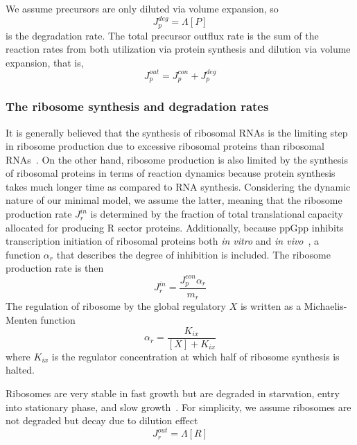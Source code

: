 \documentclass[11pt]{article}
\begin{document}
{We assume precursors {\color{black}are only diluted via volume expansion,} so
\begin{equation}
J_p^{deg}  = \Lambda[P]
\end{equation}
{\color{black}is the degradation rate.}
The total precursor outflux rate is {\color{black}the} sum of {\color{black}the} reaction rates from both {\color{black}utilization via} protein synthesis and dilution {\color{black}via volume expansion}, that is,
\begin{equation}\label{eq:aminoacid_outflux}
J_p^{out} = J_p^{con} + J_p^{deg} 
\end{equation}

\subsubsection{The ribosome synthesis and degradation rates}

It is generally believed that the synthesis of ribosomal RNAs is the limiting step in ribosome production due to excessive ribosomal proteins than ribosomal RNAs~\cite{gourse1996rrna}. On the other hand, ribosome production is also limited by the synthesis of ribosomal proteins in terms of reaction dynamics because protein synthesis takes much longer time as compared to RNA synthesis. Considering the dynamic nature of our minimal model, we assume the latter, meaning that the ribosome production rate $J_r^{in}$ is determined by the fraction of total translational capacity allocated for producing R sector proteins. {\color{black} Additionally, because ppGpp inhibits transcription initiation of ribosomal proteins both \textit{in vitro} and \textit{in vivo}~\cite{lemke2011direct}, a function $\alpha_r$ that describes the degree of inhibition is included. The ribosome production rate is then}
\begin{equation}\label{eq:ribosome_synthesis_rate}
J_r^{in} = \dfrac{J_p^{con}\alpha_r}{m_r}
\end{equation}
The regulation of ribosome by the global regulatory $X$ is written as a Michaelis-Menten function
\begin{equation}
\alpha_r = \dfrac{K_{ix}}{[X]+K_{ix}}
\end{equation}
where $K_{ix}$ {\color{black}is the regulator concentration at which half of ribosome synthesis is halted.}

Ribosomes are very stable in fast growth {\color{black}but are degraded in starvation, entry into stationary phase, and slow growth}~\cite{piir2011ribosome,deutscher2003degradation}. For simplicity, we assume ribosomes are not degraded but decay due to dilution effect
\begin{equation}\label{eq:ribosome_degradation_rate}
J_r^{out} = \Lambda[R]
\end{equation}

}
\end{document}
